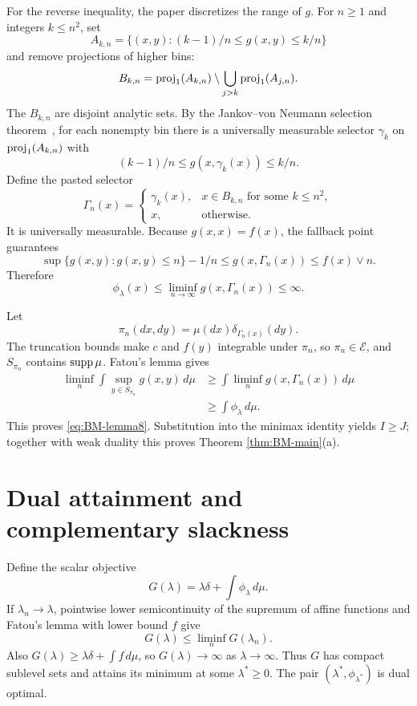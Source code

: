 For the reverse inequality, the paper discretizes the range of $g$.  For $n\ge1$ and integers
$k\le n^2$, set
\[
 A_{k,n}=\{(x,y):(k-1)/n\le g(x,y)\le k/n\}
\]
and remove projections of higher bins:
\[
 B_{k,n}=\operatorname{proj}_1(A_{k,n})\setminus
          \bigcup_{j>k}\operatorname{proj}_1(A_{j,n}).
\]
The $B_{k,n}$ are disjoint analytic sets.  By the Jankov--von Neumann selection theorem~\cite[Chapter~7]{BertsekasShreve1978}, for each
nonempty bin there is a universally measurable selector $\gamma_k$ on $\operatorname{proj}_1(A_{k,n})$ with
\begin{equation}
 (k-1)/n\le g(x,\gamma_k(x))\le k/n. \tag{37}
\end{equation}
Define the pasted selector
\[
 \Gamma_n(x)=
 \begin{cases}
  \gamma_k(x),&x\in B_{k,n}\text{ for some }k\le n^2,\\
  x,&\text{otherwise}.
 \end{cases}
\]
It is universally measurable.  Because $g(x,x)=f(x)$, the fallback point guarantees
\[
 \sup\{g(x,y):g(x,y)\le n\}-1/n
 \le g(x,\Gamma_n(x))\le f(x)\vee n.
\]
Therefore
\begin{equation}
 \phi_\lambda(x)\le\liminf_{n\to\infty}g(x,\Gamma_n(x))\le\infty. \tag{38}
\end{equation}

Let
\[
 \pi_n(dx,dy)=\mu(dx)\delta_{\Gamma_n(x)}(dy).
\]
The truncation bounds make $c$ and $f(y)$ integrable under $\pi_n$, so $\pi_n\in\mathcal E$, and
$S_{\pi_n}$ contains $\operatorname{supp}\mu$.  Fatou's lemma gives
\begin{align*}
 \liminf_n\int\sup_{y\in S_{\pi_n}}g(x,y)\,d\mu
 &\ge\int\liminf_n g(x,\Gamma_n(x))\,d\mu\\
 &\ge\int\phi_\lambda\,d\mu.
\end{align*}
This proves \eqref{eq:BM-lemma8}.  Substitution into the minimax identity yields $I\ge J$; together
with weak duality this proves Theorem \ref{thm:BM-main}(a).

\section{Dual attainment and complementary slackness}
Define the scalar objective
\[
 G(\lambda)=\lambda\delta+\int\phi_\lambda\,d\mu.
\]
If $\lambda_n\to\lambda$, pointwise lower semicontinuity of the supremum of affine functions and
Fatou's lemma with lower bound $f$ give
\[
 G(\lambda)\le\liminf_nG(\lambda_n).
\]
Also $G(\lambda)\ge\lambda\delta+\int f\,d\mu$, so $G(\lambda)\to\infty$ as
$\lambda\to\infty$.  Thus $G$ has compact sublevel sets and attains its minimum at some
$\lambda^*\ge0$.  The pair $(\lambda^*,\phi_{\lambda^*})$ is dual optimal.


